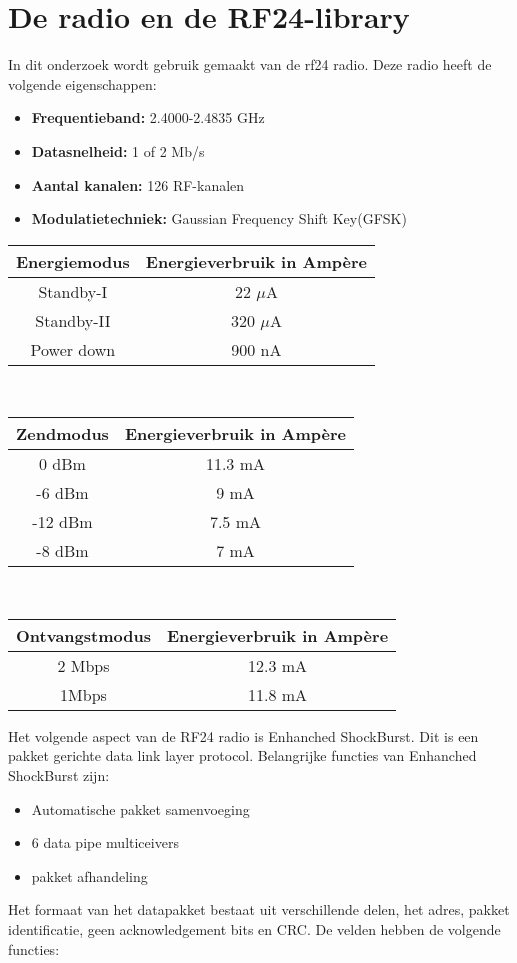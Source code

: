 \documentclass{article}
\begin{document}
\section{De radio en de RF24-library}
In dit onderzoek wordt gebruik gemaakt van de rf24 radio. Deze radio heeft de volgende eigenschappen:
	\begin{itemize}	
	\item\textbf{Frequentieband: }2.4000-2.4835 GHz
	\item\textbf{Datasnelheid: }1 of 2 Mb/s
	\item\textbf{Aantal kanalen: }126 RF-kanalen
	\item\textbf{Modulatietechniek: }Gaussian Frequency Shift Key(GFSK)
	\end{itemize}
\begin{tabular}{c||c}
\textbf{Energiemodus}  & \textbf{Energieverbruik in Amp\`ere}     \\
\hline
Standby-I   & 22 $\mu$A    \\
Standby-II  & 320 $\mu$A     \\
Power down  & 900 nA 
\end{tabular}\\
\begin{tabular}{c||c}
\textbf{Zendmodus}  & \textbf{Energieverbruik in Amp\`ere}     \\
\hline
0 dBm  & 11.3 mA    \\
-6 dBm & 9 mA     \\
-12 dBm & 7.5 mA  \\
-8 dBm & 7 mA
\end{tabular}\\
\begin{tabular}{c||c}
\textbf{Ontvangstmodus}  & \textbf{Energieverbruik in Amp\`ere}     \\
\hline
2 Mbps   & 12.3 mA    \\
1Mbps & 11.8 mA     
\end{tabular}
Het volgende aspect van de RF24 radio is Enhanched ShockBurst. Dit is een pakket gerichte data link layer protocol.
Belangrijke functies van Enhanched ShockBurst zijn:
\begin{itemize}
	\item Automatische pakket samenvoeging
	\item 6 data pipe multiceivers
	\item pakket afhandeling
\end{itemize}
Het formaat van het datapakket bestaat uit verschillende delen, het adres, pakket identificatie, geen acknowledgement bits en CRC. De velden hebben de volgende functies:
\end{document}
